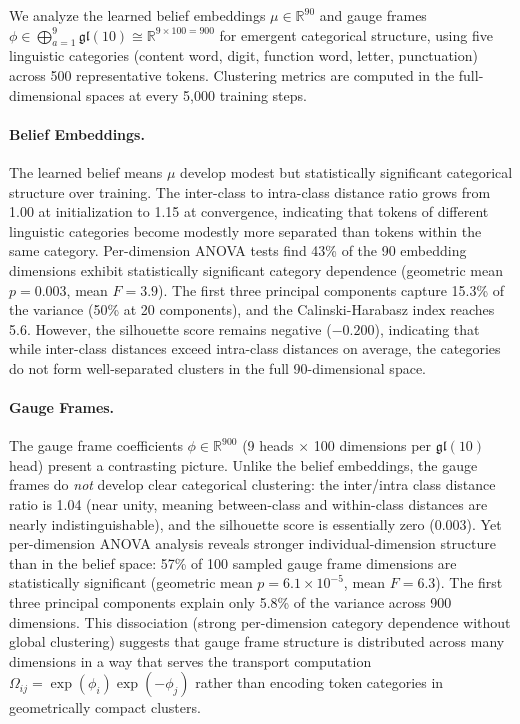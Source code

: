 \documentclass[twoside,11pt]{article}
\begin{document}
We analyze the learned belief embeddings $\mu \in \mathbb{R}^{90}$ and gauge frames $\phi \in \bigoplus_{a=1}^{9} \mathfrak{gl}(10) \cong \mathbb{R}^{9 \times 100 = 900}$ for emergent categorical structure, using five linguistic categories (content word, digit, function word, letter, punctuation) across 500 representative tokens. Clustering metrics are computed in the full-dimensional spaces at every 5,000 training steps.

\paragraph{Belief Embeddings.} The learned belief means $\mu$ develop modest but statistically significant categorical structure over training. The inter-class to intra-class distance ratio grows from 1.00 at initialization to 1.15 at convergence, indicating that tokens of different linguistic categories become modestly more separated than tokens within the same category. Per-dimension ANOVA tests find 43\% of the 90 embedding dimensions exhibit statistically significant category dependence (geometric mean $p = 0.003$, mean $F = 3.9$). The first three principal components capture 15.3\% of the variance (50\% at 20 components), and the Calinski-Harabasz index reaches 5.6. However, the silhouette score remains negative ($-0.200$), indicating that while inter-class distances exceed intra-class distances on average, the categories do not form well-separated clusters in the full 90-dimensional space.

\paragraph{Gauge Frames.} The gauge frame coefficients $\phi \in \mathbb{R}^{900}$ (9 heads $\times$ 100 dimensions per $\mathfrak{gl}(10)$ head) present a contrasting picture. Unlike the belief embeddings, the gauge frames do \emph{not} develop clear categorical clustering: the inter/intra class distance ratio is 1.04 (near unity, meaning between-class and within-class distances are nearly indistinguishable), and the silhouette score is essentially zero (0.003). Yet per-dimension ANOVA analysis reveals stronger individual-dimension structure than in the belief space: 57\% of 100 sampled gauge frame dimensions are statistically significant (geometric mean $p = 6.1 \times 10^{-5}$, mean $F = 6.3$). The first three principal components explain only 5.8\% of the variance across 900 dimensions. This dissociation (strong per-dimension category dependence without global clustering) suggests that gauge frame structure is distributed across many dimensions in a way that serves the transport computation $\Omega_{ij} = \exp(\phi_i)\exp(-\phi_j)$ rather than encoding token categories in geometrically compact clusters.
\end{document}
